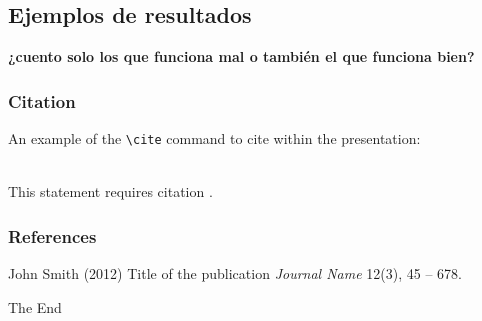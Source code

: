 \documentclass{beamer}
\begin{document}
\subsection{Ejemplos de resultados}
\begin{frame}
\textbf{¿cuento solo los que funciona mal o también el que funciona bien?}
\end{frame}





\begin{frame}[fragile] %
\frametitle{Citation}
An example of the \verb|\cite| command to cite within the presentation:\\~

This statement requires citation \cite{p1}.
\end{frame}


\begin{frame}
\frametitle{References}
\footnotesize{
\begin{thebibliography}{99} %
 John Smith (2012)
\newblock Title of the publication
\newblock \emph{Journal Name} 12(3), 45 -- 678.
\end{thebibliography}
}
\end{frame}


\begin{frame}
\Huge{\centerline{The End}}
\end{frame}

\end{document}
